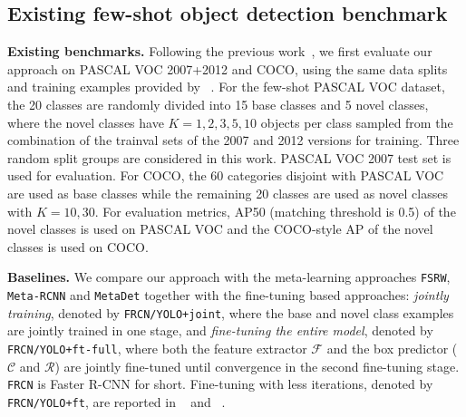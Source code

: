 \documentclass{article}
\newcommand\minisection[1]{\vspace{1mm}\noindent \textbf{#1}}
\begin{document}
\subsection{Existing few-shot object detection benchmark}
\label{sec:exist_benchmark}
\minisection{Existing benchmarks.} 
Following the previous work~\cite{kang2019few,yan2019meta,wang2019meta}, we 
first evaluate our approach on PASCAL VOC 2007+2012 and COCO, using the same data splits and training examples provided by ~\citet{kang2019few}.
For the few-shot PASCAL VOC dataset,  the 20 classes are randomly divided into 15 base classes and 5 novel classes, where the novel classes have $K=1,2,3,5,10$ objects per class sampled from the combination of the trainval sets of the 2007 and 2012 versions for training. Three random split groups are considered in this work. PASCAL VOC 2007 test set is used for evaluation. For COCO, the 60 categories disjoint with PASCAL VOC are used as base classes while the remaining 20 classes are used as novel classes with $K=10, 30$.  For evaluation metrics, AP50 (matching threshold is 0.5) of the novel classes is used on PASCAL VOC and the COCO-style AP of the novel classes is used on COCO. 


\minisection{Baselines.} We compare our approach with the meta-learning approaches \texttt{FSRW}, \texttt{Meta-RCNN} and \texttt{MetaDet} together with the fine-tuning
based approaches:  \emph{jointly training}, denoted by \texttt{FRCN/YOLO+joint}, where the base and novel class examples are jointly trained in one stage,  and \emph{fine-tuning the entire model}, denoted by \texttt{FRCN/YOLO+ft-full}, where both the feature extractor $\mathcal{F}$ and the box predictor ($\mathcal{C}$ and $\mathcal{R}$) are jointly fine-tuned until convergence in the second fine-tuning stage. \texttt{FRCN} is Faster R-CNN for short. Fine-tuning with less iterations, denoted by \texttt{FRCN/YOLO+ft}, are reported in ~\citet{kang2019few} and ~\citet{yan2019meta}.
\end{document}
